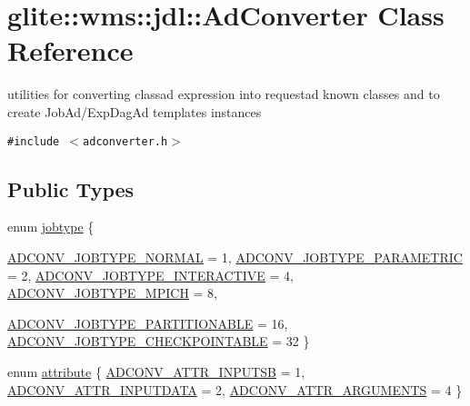 \hypertarget{classglite_1_1wms_1_1jdl_1_1AdConverter}{
\section{glite::wms::jdl::Ad\-Converter Class Reference}
\label{classglite_1_1wms_1_1jdl_1_1AdConverter}
}
utilities for converting classad expression into requestad known classes and to create Job\-Ad/Exp\-Dag\-Ad templates instances  


{\tt \#include $<$adconverter.h$>$}

\subsection*{Public Types}
\begin{CompactItemize}
\item 
enum \hyperlink{classglite_1_1wms_1_1jdl_1_1AdConverter_w9}{jobtype} \{ \par
\hyperlink{classglite_1_1wms_1_1jdl_1_1AdConverter_w9w0}{ADCONV\_\-JOBTYPE\_\-NORMAL} = 1, 
\hyperlink{classglite_1_1wms_1_1jdl_1_1AdConverter_w9w1}{ADCONV\_\-JOBTYPE\_\-PARAMETRIC} = 2, 
\hyperlink{classglite_1_1wms_1_1jdl_1_1AdConverter_w9w2}{ADCONV\_\-JOBTYPE\_\-INTERACTIVE} = 4, 
\hyperlink{classglite_1_1wms_1_1jdl_1_1AdConverter_w9w3}{ADCONV\_\-JOBTYPE\_\-MPICH} = 8, 
\par
\hyperlink{classglite_1_1wms_1_1jdl_1_1AdConverter_w9w4}{ADCONV\_\-JOBTYPE\_\-PARTITIONABLE} = 16, 
\hyperlink{classglite_1_1wms_1_1jdl_1_1AdConverter_w9w5}{ADCONV\_\-JOBTYPE\_\-CHECKPOINTABLE} = 32
 \}
\item 
enum \hyperlink{classglite_1_1wms_1_1jdl_1_1AdConverter_w10}{attribute} \{ \hyperlink{classglite_1_1wms_1_1jdl_1_1AdConverter_w10w6}{ADCONV\_\-ATTR\_\-INPUTSB} = 1, 
\hyperlink{classglite_1_1wms_1_1jdl_1_1AdConverter_w10w7}{ADCONV\_\-ATTR\_\-INPUTDATA} = 2, 
\hyperlink{classglite_1_1wms_1_1jdl_1_1AdConverter_w10w8}{ADCONV\_\-ATTR\_\-ARGUMENTS} = 4
 \}
\end{CompactItemize}
